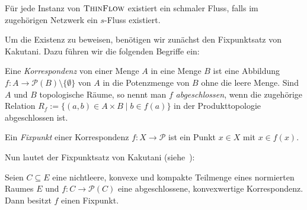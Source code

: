 \begin{theorem}\label{thm-existence-thin-flow}
	Für jede Instanz von $\textsc{ThinFlow}$ existiert ein schmaler Fluss, falls im zugehörigen Netzwerk ein $s$-Fluss existiert.
\end{theorem}

Um die Existenz zu beweisen, benötigen wir zunächst den Fixpunktsatz von Kakutani.
Dazu führen wir die folgenden Begriffe ein:

\begin{definition}
	Eine \emph{Korrespondenz} von einer Menge $A$ in eine Menge $B$ ist eine Abbildung $f: A \to \mathcal{P}(B)\setminus \{ \emptyset \}$ von $A$ in die Potenzmenge von $B$ ohne die leere Menge.
	Sind $A$ und $B$ topologische Räume, so nennt man $f$ \emph{abgeschlossen}, wenn die zugehörige Relation $R_f := \{ (a,b) \in A\times B \mid b\in f(a)  \}$ in der Produkttopologie abgeschlossen ist.

	Ein \emph{Fixpunkt} einer Korrespondenz $f: X \to \mathcal{P}$ ist ein Punkt $x\in X$ mit $x\in f(x)$.
\end{definition}

Nun lautet der Fixpunktsatz von Kakutani (siehe~\cite{Heuser1991Fix}):

\begin{satz}\label{satz-kakutani}
	Seien $C\subseteq E$ eine nichtleere, konvexe und kompakte Teilmenge eines normierten Raumes $E$ und $f: C \to \mathcal{P}(C)$ eine abgeschlossene, konvexwertige Korrespondenz.
	Dann besitzt $f$ einen Fixpunkt.
\end{satz}

